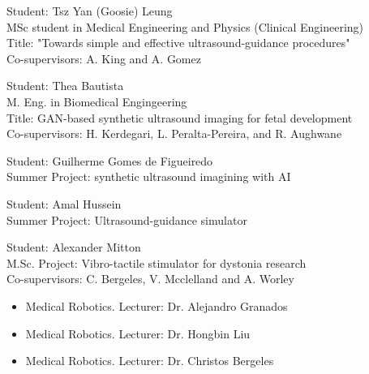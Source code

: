 \documentclass{mycv}
\begin{document}
Student: Tsz Yan (Goosie) Leung  \\
MSc student in Medical Engineering and Physics (Clinical Engineering) \\
Title: "Towards simple and effective ultrasound-guidance procedures" \\
Co-supervisors: A. King and A. Gomez

Student: Thea Bautista  \\
M. Eng. in Biomedical Engingeering \\
Title: GAN-based synthetic ultrasound imaging for fetal development \\
Co-supervisors: H. Kerdegari, L. Peralta-Pereira, and R. Aughwane

Student: Guilherme Gomes de Figueiredo  \\
Summer Project: synthetic ultrasound imagining with AI

Student: Amal Hussein  \\
Summer Project: Ultrasound-guidance simulator

Student: Alexander Mitton  \\
M.Sc. Project: Vibro-tactile stimulator for dystonia research \\
Co-supervisors: C. Bergeles, V. Mcclelland and A. Worley

\begin{positions}
\end{positions}
\begin{itemize}
	\item Medical Robotics. Lecturer: Dr. Alejandro Granados 
	\item Medical Robotics. Lecturer: Dr. Hongbin Liu 
	\item Medical Robotics. Lecturer: Dr. Christos Bergeles 
\end{itemize}
\vspace{\parskip}
\end{document}
